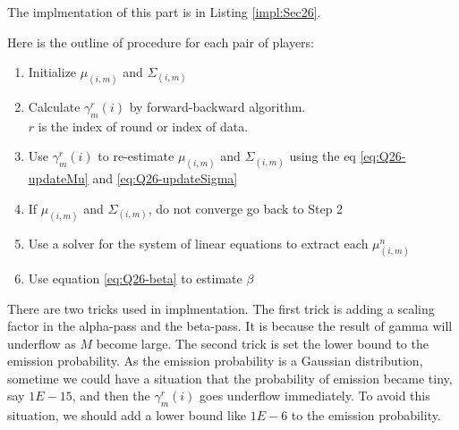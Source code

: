 \documentclass[12pt]{article}
\newenvironment{problem}[2][Problem]{\begin{trivlist}
\item[\hskip \labelsep {\bfseries #1}\hskip \labelsep {\bfseries #2.}]}{\end{trivlist}}
\begin{document}
\begin{problem}{2.6.19}
The implmentation of this part is in Listing \ref{impl:Sec26}.

Here is the outline of procedure for each pair of players:
\begin{enumerate}[Step 1:]
    \item Initialize $\mu_{(i,m)}$ and $\Sigma_{(i,m)}$
    \item Calculate $\gamma^{r}_{m}(i)$ by forward-backward algorithm. \\
          $r$ is the index of round or index of data.
    \item Use $\gamma^{r}_{m}(i)$ to re-estimate $\mu_{(i,m)}$ and $\Sigma_{(i,m)}$
            using the eq \eqref{eq:Q26-updateMu} and \eqref{eq:Q26-updateSigma}
    \item If $\mu_{(i,m)}$ and $\Sigma_{(i,m)}$, do not converge go back to Step 2
    \item Use a solver for the system of linear equations to extract each $\mu^{n}_{(i,m)}$
    \item Use equation \eqref{eq:Q26-beta} to estimate $\beta$
\end{enumerate}

There are two tricks used in implmentation. The first trick is adding a scaling
factor in the alpha-pass and the beta-pass. It is because the result of gamma will 
underflow as $M$ become large. The second trick is set the lower bound to the 
emission probability. As the emission probability is a Gaussian distribution, 
sometime we could have a situation that the probability of emission became tiny,
say $1E-15$, and then the $\gamma^{r}_{m}(i)$ goes underflow immediately. To avoid
this situation, we should add a lower bound like $1E-6$ to the emission probability.
\end{problem}
\end{document}
